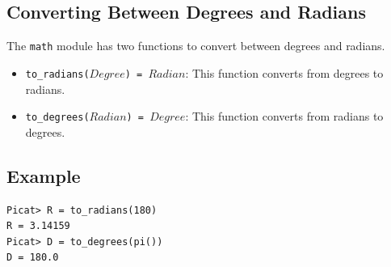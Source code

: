 \subsection{Converting Between Degrees and Radians}
The \texttt{math} module has two functions to convert between degrees and radians.
\begin{itemize}
\item \texttt{to\_radians($Degree$) = $Radian$}: This function converts from degrees to radians.
\item \texttt{to\_degrees($Radian$) = $Degree$}: This function converts from radians to degrees.
\end{itemize}

\subsection*{Example}
\begin{verbatim}
Picat> R = to_radians(180)
R = 3.14159
Picat> D = to_degrees(pi())
D = 180.0
\end{verbatim}

